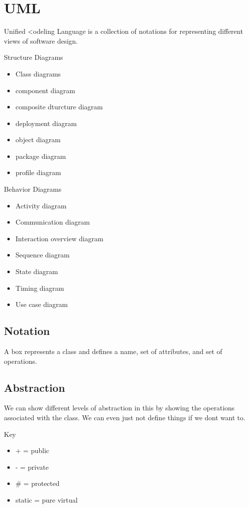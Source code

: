 \documentclass[12pt]{article}
\begin{document}
\section{UML}
Unified <odeling Language is a collection of notations for representing different views of software design.

Structure Diagrams
\begin{itemize}
    \item Class diagrams\
    \item component diagram
    \item composite dturcture diagram
    \item deployment diagram
    \item object diagram
    \item package diagram
    \item profile diagram
\end{itemize}

Behavior Diagrams
\begin{itemize}
    \item Activity diagram
    \item Communication diagram
    \item Interaction overview diagram
    \item Sequence diagram
    \item State diagram
    \item Timing diagram
    \item Use case diagram
\end{itemize}

\subsection*{Notation}
A box represents a class and defines a name, set of  attributes, and set of operations.

\subsection*{Abstraction}
We can show different levels of abstraction in this by showing the operations associated with the class. We can even just not define things if we dont want to.

Key
\begin{itemize}
    \item + = public
    \item - = private
    \item \# = protected
    \item static = pure virtual
\end{itemize}
\end{document}
